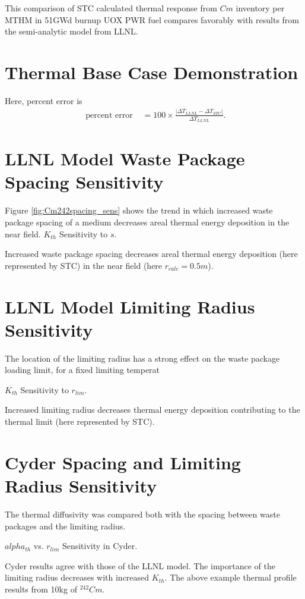 \documentclass[letterpaper]{article}
\begin{document}
This comparison of STC calculated thermal response from $Cm$ 
inventory per MTHM in 51GWd burnup UOX PWR fuel compares favorably with results 
from the semi-analytic model from LLNL.


  \section*{Thermal Base Case Demonstration}
Here, percent error is 
\begin{align}
\mbox{ percent error } &= 100\times\frac{\left|\Delta T_{LLNL} - \Delta 
T_{STC}\right|}{ \Delta T_{LLNL}}.
\end{align}

\section*{LLNL Model Waste Package Spacing Sensitivity}
  Figure \ref{fig:Cm242spacing_sens} shows the trend in which increased waste 
  package spacing of a medium decreases areal thermal energy 
  deposition in the near field.
  $K_{th}$ Sensitivity to $s$.
  
  Increased waste package 
  spacing decreases areal thermal energy deposition 
  (here represented by STC) in the near field (here $r_{calc} = 0.5m$).


\section*{LLNL Model Limiting Radius Sensitivity}
  The location of the limiting radius has a strong effect on the 
  waste package loading limit, for a fixed limiting temperat
  
  $K_{th}$ Sensitivity to $r_{lim}$.
  
  Increased limiting radius decreases thermal energy deposition contributing to 
  the thermal limit (here represented by STC).

\section*{Cyder Spacing and Limiting Radius Sensitivity}
  The thermal diffusivity was compared both with the 
  spacing between waste packages and the limiting radius. 

  $alpha_{th}$ vs. $r_{lim}$ Sensitivity in Cyder.

  Cyder results agree with those of the LLNL model. The importance of the 
  limiting radius decreases with increased $K_{th}$. The above example thermal 
  profile results from 10kg of $^{242}Cm$.
\end{document}
